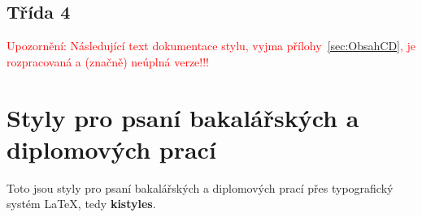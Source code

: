 \documentclass[
  biblatex,
  glossaries,
  index
]{kidiplom}
\begin{document}
\subsection{Třída 4}


























































































\noindent\textcolor{red}{\LARGE Upozornění: Následující text
  dokumentace stylu, vyjma přílohy~\ref{sec:ObsahCD}, je rozpracovaná
  a (značně) neúplná verze!!!}

\section{Styly pro psaní bakalářských a diplomových prací}
Toto jsou styly pro psaní bakalářských a diplomových prací přes typografický systém \LaTeX{}, tedy \textbf{kistyles}.
\end{document}
